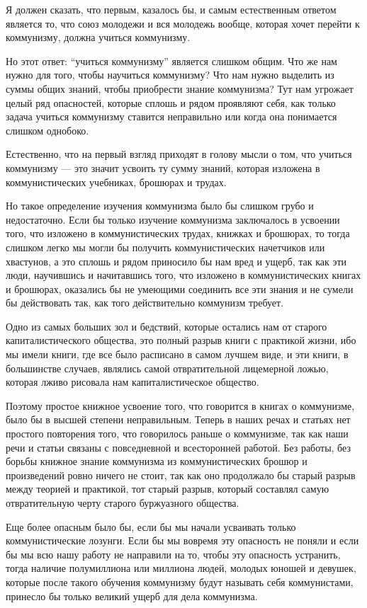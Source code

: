 \documentclass[12pt]{article}
\newcommand{\parnum}{(\arabic{parcount})}
\newcounter{parcount}
\newenvironment{parnumbers}{%
  \par%
  \everypar{\noindent \stepcounter{parcount}\marginpar[]{\parnum}}%
}{}
\begin{document}
\begin{parnumbers}
Я должен сказать, что первым, казалось бы, и самым естественным ответом является то, что союз молодежи и вся молодежь вообще, которая хочет перейти к коммунизму, должна учиться коммунизму.

Но этот ответ: “учиться коммунизму” является слишком общим. Что же нам нужно для того, чтобы научиться коммунизму? Что нам нужно выделить из суммы общих знаний, чтобы приобрести знание коммунизма? Тут нам угрожает целый ряд опасностей, которые сплошь и рядом проявляют себя, как только задача учиться коммунизму ставится неправильно или когда она понимается слишком однобоко.

Естественно, что на первый взгляд приходят в голову мысли о том, что учиться коммунизму — это значит усвоить ту сумму знаний, которая изложена в коммунистических учебниках, брошюрах и трудах.

Но такое определение изучения коммунизма было бы слишком грубо и недостаточно. Если бы только изучение коммунизма заключалось в усвоении того, что изложено в коммунистических трудах, книжках и брошюрах, то тогда слишком легко мы могли бы получить коммунистических начетчиков или хвастунов, а это сплошь и рядом приносило бы нам вред и ущерб, так как эти люди, научившись и начитавшись того, что изложено в коммунистических книгах и брошюрах, оказались бы не умеющими соединить все эти знания и не сумели бы действовать так, как того действительно коммунизм требует.

Одно из самых больших зол и бедствий, которые остались нам от старого капиталистического общества, это полный разрыв книги с практикой жизни, ибо мы имели книги, где все было расписано в самом лучшем виде, и эти книги, в большинстве случаев, являлись самой отвратительной лицемерной ложью, которая лживо рисовала нам капиталистическое общество.

Поэтому простое книжное усвоение того, что говорится в книгах о коммунизме, было бы в высшей степени неправильным. Теперь в наших речах и статьях нет простого повторения того, что говорилось раньше о коммунизме, так как наши речи и статьи связаны с повседневной и всесторонней работой. Без работы, без борьбы книжное знание коммунизма из коммунистических брошюр и произведений ровно ничего не стоит, так как оно продолжало бы старый разрыв между теорией и практикой, тот старый разрыв, который составлял самую отвратительную черту старого буржуазного общества.

Еще более опасным было бы, если бы мы начали усваивать только коммунистические лозунги. Если бы мы вовремя эту опасность не поняли и если бы мы всю нашу работу не направили на то, чтобы эту опасность устранить, тогда наличие полумиллиона или миллиона людей, молодых юношей и девушек, которые после такого обучения коммунизму будут называть себя коммунистами, принесло бы только великий ущерб для дела коммунизма.


\end{parnumbers}
\end{document}
